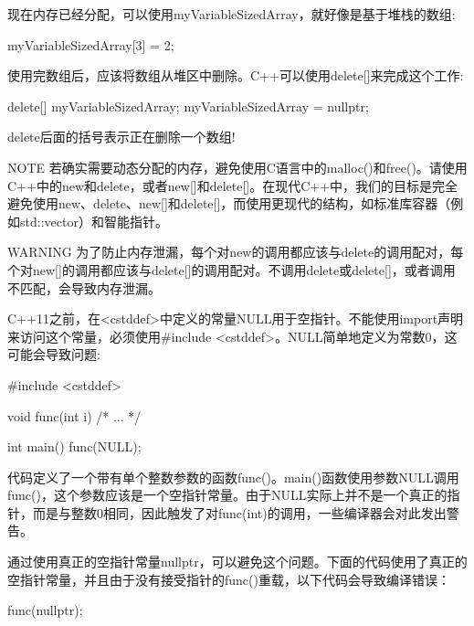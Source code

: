现在内存已经分配，可以使用myVariableSizedArray，就好像是基于堆栈的数组:

\begin{cpp}
myVariableSizedArray[3] = 2;
\end{cpp}

使用完数组后，应该将数组从堆区中删除。C++可以使用delete[]来完成这个工作:

\begin{cpp}
delete[] myVariableSizedArray;
myVariableSizedArray = nullptr;
\end{cpp}

delete后面的括号表示正在删除一个数组!

\begin{myNotic}{NOTE}
若确实需要动态分配的内存，避免使用C语言中的malloc()和free()。请使用C++中的new和delete，或者new[]和delete[]。在现代C++中，我们的目标是完全避免使用new、delete、new[]和delete[]，而使用更现代的结构，如标准库容器（例如std::vector）和智能指针。
\end{myNotic}

\begin{myWarning}{WARNING}
为了防止内存泄漏，每个对new的调用都应该与delete的调用配对，每个对new[]的调用都应该与delete[]的调用配对。不调用delete或delete[]，或者调用不匹配，会导致内存泄漏。
\end{myWarning}


C++11之前，在<cstddef>中定义的常量NULL用于空指针。不能使用import声明来访问这个常量，必须使用\#include <cstddef>。NULL简单地定义为常数0，这可能会导致问题:

\begin{cpp}
#include <cstddef>

void func(int i) { /* ... */ }

int main()
{
    func(NULL);
}
\end{cpp}

代码定义了一个带有单个整数参数的函数func()。main()函数使用参数NULL调用func()，这个参数应该是一个空指针常量。由于NULL实际上并不是一个真正的指针，而是与整数0相同，因此触发了对func(int)的调用，一些编译器会对此发出警告。

通过使用真正的空指针常量nullptr，可以避免这个问题。下面的代码使用了真正的空指针常量，并且由于没有接受指针的func()重载，以下代码会导致编译错误：

\begin{cpp}
func(nullptr);
\end{cpp}


